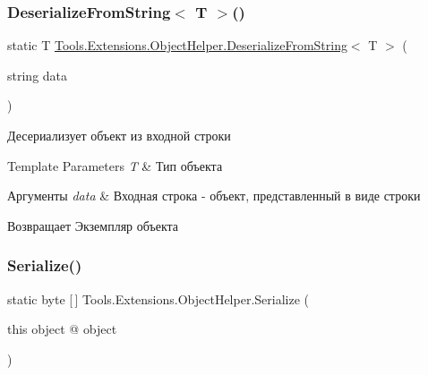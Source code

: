 \subsubsection{\texorpdfstring{Deserialize\+From\+String$<$ T $>$()}{DeserializeFromString< T >()}}
{\footnotesize\ttfamily static T \hyperlink{class_tools_1_1_extensions_1_1_object_helper_a2dd94da1024292cb58b13470fa6098ea}{Tools.\+Extensions.\+Object\+Helper.\+Deserialize\+From\+String}$<$ T $>$ (\begin{DoxyParamCaption}\item[{string}]{data }\end{DoxyParamCaption})\hspace{0.3cm}{\ttfamily [static]}}



Десериализует объект из входной строки 


\begin{DoxyTemplParams}{Template Parameters}
{\em T} & Тип объекта\\
\hline
\end{DoxyTemplParams}

\begin{DoxyParams}{Аргументы}
{\em data} & Входная строка -\/ объект, представленный в виде строки\\
\hline
\end{DoxyParams}
\begin{DoxyReturn}{Возвращает}
Экземпляр объекта
\end{DoxyReturn}
\mbox{\label{class_tools_1_1_extensions_1_1_object_helper_abd2c46ca419822530e491486a73cd0e4}} 
\subsubsection{\texorpdfstring{Serialize()}{Serialize()}}
{\footnotesize\ttfamily static byte \mbox{[}$\,$\mbox{]} Tools.\+Extensions.\+Object\+Helper.\+Serialize (\begin{DoxyParamCaption}\item[{this object @}]{object }\end{DoxyParamCaption})\hspace{0.3cm}{\ttfamily [static]}}



